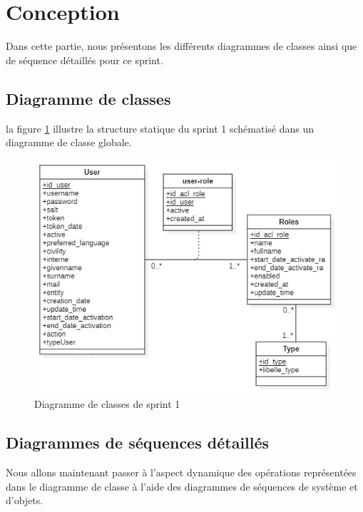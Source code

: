 \section{Conception}
Dans cette partie, nous présentons les différents diagrammes de classes ainsi que de séquence détaillés pour ce sprint.
\subsection{Diagramme de classes}
la figure \ref{fig:classdiag-sprint1} illustre la structure statique du sprint 1 schématisé dans un diagramme de classe globale.
\begin{figure}[H]
	\centering
	\includegraphics[width=0.7\linewidth]{img/conception/classes/ClassDiag-sprint1}
	\caption[Diagramme de classes de sprint 1]{Diagramme de classes de sprint 1}
	\label{fig:classdiag-sprint1}
\end{figure}
\subsection{Diagrammes de séquences détaillés}
Nous allons maintenant passer à l’aspect dynamique des opérations représentées dans le diagramme de classe à l’aide des diagrammes de séquences de système et d’objets.
